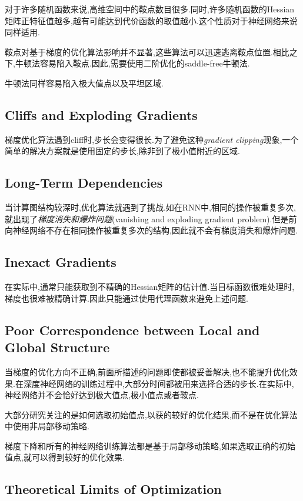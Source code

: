 对于许多随机函数来说,高维空间中的鞍点数目很多.同时,许多随机函数的Hessian矩阵正特征值越多,越有可能达到代价函数的取值越小.这个性质对于神经网络来说同样适用.

鞍点对基于梯度的优化算法影响并不显著,这些算法可以迅速逃离鞍点位置.相比之下,牛顿法容易陷入鞍点.因此,需要使用二阶优化的saddle-free牛顿法.

牛顿法同样容易陷入极大值点以及平坦区域.

\subsection{Cliffs and Exploding Gradients}

梯度优化算法遇到cliff时,步长会变得很长.为了避免这种\textit{gradient clipping}现象,一个简单的解决方案就是使用固定的步长,除非到了极小值附近的区域.

\subsection{Long-Term Dependencies}

当计算图结构较深时,优化算法就遇到了挑战.如在RNN中,相同的操作被重复多次,就出现了\textit{梯度消失和爆炸问题}(vanishing and exploding gradient problem).但是前向神经网络不存在相同操作被重复多次的结构,因此就不会有梯度消失和爆炸问题.

\subsection{Inexact Gradients}

在实际中,通常只能获取到不精确的Hessian矩阵的估计值.当目标函数很难处理时,梯度也很难被精确计算.因此只能通过使用代理函数来避免上述问题.

\subsection{Poor Correspondence between Local and Global Structure}

当梯度的优化方向不正确,前面所描述的问题即使都被妥善解决,也不能提升优化效果.在深度神经网络的训练过程中,大部分时间都被用来选择合适的步长.在实际中,神经网络并不会恰好达到极大值点,极小值点或者鞍点.

大部分研究关注的是如何选取初始值点,以获的较好的优化结果,而不是在优化算法中使用非局部移动策略.

梯度下降和所有的神经网络训练算法都是基于局部移动策略,如果选取正确的初始值点,就可以得到较好的优化效果.

\subsection{Theoretical Limits of Optimization}

